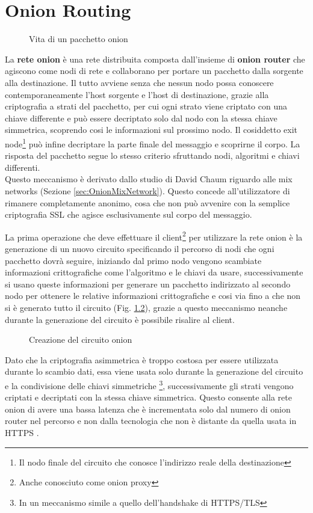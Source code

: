 \chapter{Onion Routing}
\label{chap:Capitolo1}

\begin{figure}[htpb!]
    \centering
    
    \caption{Vita di un pacchetto onion}
    \label{fig:routing}
\end{figure}

La \textbf{rete onion} è una rete distribuita composta dall'insieme di \textbf{onion router} che agiscono come nodi di rete e collaborano per portare un pacchetto dalla sorgente alla destinazione. 
Il tutto avviene senza che nessun nodo possa conoscere contemporaneamente l'host sorgente e l'host di destinazione, grazie alla criptografia a strati del pacchetto, per cui ogni strato viene criptato con una chiave differente e può essere decriptato solo dal nodo con la stessa chiave simmetrica, scoprendo cosi le informazioni sul prossimo nodo. 
Il cosiddetto exit node\footnote{Il nodo finale del circuito che conosce l'indirizzo reale della destinazione} può infine decriptare la parte finale del messaggio e scoprirne il corpo. 
La risposta del pacchetto segue lo stesso criterio sfruttando nodi, algoritmi e chiavi differenti. \\
Questo meccanismo è derivato dallo studio di David Chaum riguardo alle mix networks (Sezione \ref{sec:OnionMixNetwork}).
Questo concede all'utilizzatore di rimanere completamente anonimo, cosa che non può avvenire con la semplice criptografia SSL che agisce esclusivamente sul corpo del messaggio.

\newpage La prima operazione che deve effettuare il client\footnote{Anche conosciuto come onion proxy} per utilizzare la rete onion è la generazione di un nuovo circuito specificando il percorso di nodi che ogni pacchetto dovrà seguire, iniziando dal primo nodo vengono scambiate informazioni crittografiche come l'algoritmo e le chiavi da usare, successivamente si usano queste informazioni per generare un pacchetto indirizzato al secondo nodo per ottenere le relative informazioni crittografiche e cosi via fino a che non si è generato tutto il circuito (Fig. \ref{fig:circuitCreation}), grazie a questo meccanismo neanche durante la generazione del circuito è possibile risalire al client. 

\begin{figure}[htpb!]
    \centering
    
    \caption{Creazione del circuito onion}
    \label{fig:circuitCreation}
\end{figure}
Dato che la criptografia asimmetrica è troppo costosa per essere utilizzata durante lo scambio dati, essa viene usata solo durante la generazione del circuito e la condivisione delle chiavi simmetriche \footnote{In un meccanismo simile a quello dell'handshake di HTTPS/TLS}, successivamente gli strati vengono criptati e decriptati con la stessa chiave simmetrica. 
Questo consente alla rete onion di avere una bassa latenza che è incrementata solo dal numero di onion router nel percorso e non dalla tecnologia che non è distante da quella usata in HTTPS 
\cite{OnionRouting}.

